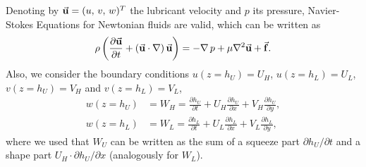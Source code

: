 Denoting by $\vec{\mathbf{u}}=(u,\, v,\, w)^T$ the lubricant velocity and $p$ its pressure, Navier-Stokes Equations for Newtonian fluids are valid, which can be written as
\begin{equation}
\rho \left( \frac{\partial \veca{u}}{\partial t} + \left( \veca{u}\cdot \nabla\right) \veca{u}\right) = -\nabla\,p+\mu \nabla^2 \veca{u} +\veca{f}.\label{eq:nvs}
\end{equation}
Also, we consider the boundary conditions $u(z=h_U)=U_H$, $u(z=h_L)=U_L$,\break $v(z=h_U)=V_H$ and $v(z=h_L)=V_L$, 
\begin{align*}
w(z=h_U)&=W_H=\frac{\partial h_U}{\partial t}+U_H\frac{\partial h_U}{\partial x}+V_H\frac{\partial h_U}{\partial y},\\ w(z=h_L)&=W_L=\frac{\partial h_L}{\partial t}+U_L\frac{\partial h_L}{\partial x}+V_L\frac{\partial h_L}{\partial y},
\end{align*}
where we used that $W_U$ can be written as the sum of a squeeze part $\partial h_U/\partial t$ and a 
shape part $U_H\cdot \partial h_U /\partial x$ (analogously for $W_L$).

